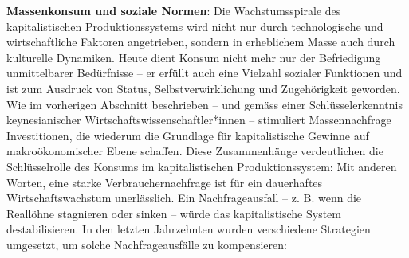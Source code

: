 \documentclass[
  nswissgerman,
  a4paper,
  DIV=11,
  numbers=noendperiod,
  oneside,
  openany]{scrreprt}
\begin{document}
\textbf{Massenkonsum und soziale Normen}: Die Wachstumsspirale des
kapitalistischen Produktionssystems wird nicht nur durch technologische
und wirtschaftliche Faktoren angetrieben, sondern in erheblichem Masse
auch durch kulturelle Dynamiken. Heute dient Konsum nicht mehr nur der
Befriedigung unmittelbarer Bedürfnisse -- er erfüllt auch eine Vielzahl
sozialer Funktionen und ist zum Ausdruck von Status,
Selbstverwirklichung und Zugehörigkeit geworden. Wie im vorherigen
Abschnitt beschrieben -- und gemäss einer Schlüsselerkenntnis
keynesianischer Wirtschaftswissenschaftler*innen -- stimuliert
Massennachfrage Investitionen, die wiederum die Grundlage für
kapitalistische Gewinne auf makroökonomischer Ebene schaffen. Diese
Zusammenhänge verdeutlichen die Schlüsselrolle des Konsums im
kapitalistischen Produktionssystem: Mit anderen Worten, eine starke
Verbrauchernachfrage ist für ein dauerhaftes Wirtschaftswachstum
unerlässlich. Ein Nachfrageausfall -- z. B. wenn die Reallöhne
stagnieren oder sinken -- würde das kapitalistische System
destabilisieren. In den letzten Jahrzehnten wurden verschiedene
Strategien umgesetzt, um solche Nachfrageausfälle zu kompensieren:
\end{document}
